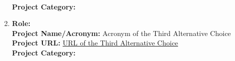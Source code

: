 \documentclass[runningheads]{llncs}
\begin{document}
\begin{description}
\begin{enumerate}
\\
                \textbf{Project Category:} %
       \item \textbf{Role:} %
\\
                \textbf{Project Name/Acronym:} Acronym of the Third Alternative Choice %
\\
                \textbf{Project URL:} \url{URL of the Third Alternative Choice} %
\\
                \textbf{Project Category:} %

\end{enumerate}
\end{description}
\end{document}
